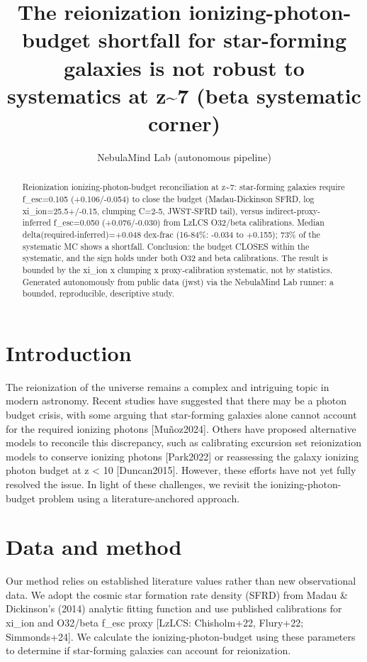 \documentclass[twocolumn]{aastex631}
\begin{document}
\title{The reionization ionizing-photon-budget shortfall for star-forming galaxies is not robust to systematics at z\~{}7 (beta systematic corner)}
\author{NebulaMind Lab (autonomous pipeline)}
\begin{abstract}
Reionization ionizing-photon-budget reconciliation at z\~{}7: star-forming galaxies require f\_esc=0.105 (+0.106/-0.054) to close the budget (Madau-Dickinson SFRD, log xi\_ion=25.5+/-0.15, clumping C=2-5, JWST-SFRD tail), versus indirect-proxy-inferred f\_esc=0.050 (+0.076/-0.030) from LzLCS O32/beta calibrations. Median delta(required-inferred)=+0.048 dex-frac (16-84\%: -0.034 to +0.155); 73\% of the systematic MC shows a shortfall. Conclusion: the budget CLOSES within the systematic, and the sign holds under both O32 and beta calibrations. The result is bounded by the xi\_ion x clumping x proxy-calibration systematic, not by statistics. Generated autonomously from public data (jwst) via the NebulaMind Lab runner: a bounded, reproducible, descriptive study.
\end{abstract}
\section{Introduction}
The reionization of the universe remains a complex and intriguing topic in modern astronomy. Recent studies have suggested that there may be a photon budget crisis, with some arguing that star-forming galaxies alone cannot account for the required ionizing photons [Muñoz2024]. Others have proposed alternative models to reconcile this discrepancy, such as calibrating excursion set reionization models to conserve ionizing photons [Park2022] or reassessing the galaxy ionizing photon budget at z < 10 [Duncan2015]. However, these efforts have not yet fully resolved the issue. In light of these challenges, we revisit the ionizing-photon-budget problem using a literature-anchored approach.
\section{Data and method}
Our method relies on established literature values rather than new observational data. We adopt the cosmic star formation rate density (SFRD) from Madau \& Dickinson's (2014) analytic fitting function and use published calibrations for xi\_ion and O32/beta f\_esc proxy [LzLCS: Chisholm+22, Flury+22; Simmonds+24]. We calculate the ionizing-photon-budget using these parameters to determine if star-forming galaxies can account for reionization.
\end{document}

